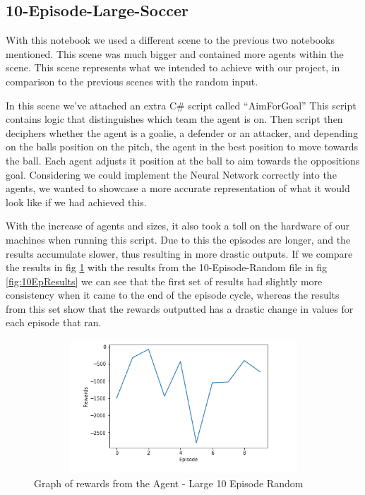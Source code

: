 \begin{itemize}
\subsection{10-Episode-Large-Soccer}
With this notebook we used a different scene to the previous two notebooks mentioned. This scene was much bigger and contained more agents within the scene. This scene represents what we intended to achieve with our project, in comparison to the previous scenes with the random input. 

In this scene we’ve attached an extra C\# script called “AimForGoal” This script contains logic that distinguishes which team the agent is on. Then script then deciphers whether the agent is a goalie, a defender or an attacker, and depending on the balls position on the pitch, the agent in the best position to move towards the ball. Each agent adjusts it position at the ball to aim towards the oppositions goal. Considering we could implement the Neural Network correctly into the agents, we wanted to showcase a more accurate representation of what it would look like if we had achieved this. 

With the increase of agents and sizes, it also took a toll on the hardware of our machines when running this script. Due to this the episodes are longer, and the results accumulate slower, thus resulting in more drastic outputs. If we compare the results in fig \ref{fig:10EpLarge} with the results from the 10-Episode-Random file in fig \ref{fig:10EpResults} we can see that the first set of results had slightly more consistency when it came to the end of the episode cycle, whereas the results from this set show that the rewards outputted has a drastic change in values for each episode that ran. 

\begin{figure}[H]
    \centering
    \includegraphics[width=120mm, height=50mm]{img/Large10Episode.PNG}
    \caption{Graph of rewards from the Agent - Large 10 Episode Random}
    \label{fig:10EpLarge}
\end{figure}


\end{itemize}
